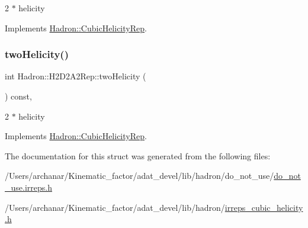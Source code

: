 2 $\ast$ helicity 

Implements \mbox{\hyperlink{structHadron_1_1CubicHelicityRep_af507aa56fc2747eacc8cb6c96db31ecc}{Hadron\+::\+Cubic\+Helicity\+Rep}}.

\mbox{\label{structHadron_1_1H2D2A2Rep_a37671b4331422027fe047d7e50288c54}} 
\subsubsection{\texorpdfstring{twoHelicity()}{twoHelicity()}\hspace{0.1cm}{\footnotesize\ttfamily [2/2]}}
{\footnotesize\ttfamily int Hadron\+::\+H2\+D2\+A2\+Rep\+::two\+Helicity (\begin{DoxyParamCaption}{ }\end{DoxyParamCaption}) const\hspace{0.3cm}{\ttfamily [inline]}, {\ttfamily [virtual]}}

2 $\ast$ helicity 

Implements \mbox{\hyperlink{structHadron_1_1CubicHelicityRep_af507aa56fc2747eacc8cb6c96db31ecc}{Hadron\+::\+Cubic\+Helicity\+Rep}}.



The documentation for this struct was generated from the following files\+:\begin{DoxyCompactItemize}
\item 
/\+Users/archanar/\+Kinematic\+\_\+factor/adat\+\_\+devel/lib/hadron/do\+\_\+not\+\_\+use/\mbox{\hyperlink{do__not__use_8irreps_8h}{do\+\_\+not\+\_\+use.\+irreps.\+h}}\item 
/\+Users/archanar/\+Kinematic\+\_\+factor/adat\+\_\+devel/lib/hadron/\mbox{\hyperlink{lib_2hadron_2irreps__cubic__helicity_8h}{irreps\+\_\+cubic\+\_\+helicity.\+h}}\end{DoxyCompactItemize}
